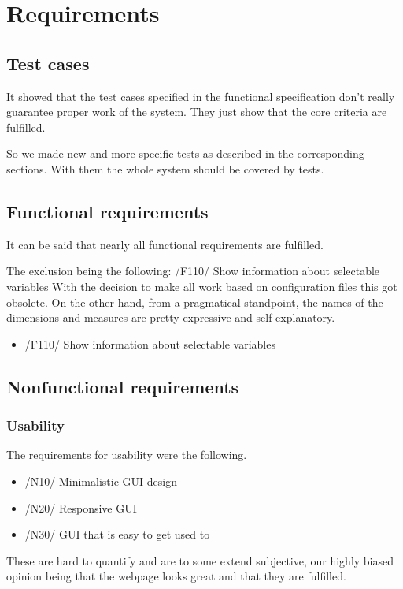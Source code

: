 \section{Requirements}\label{spec}


\subsection{Test cases}
It showed that the test cases specified in the functional specification
don't really guarantee proper work of the system. They just show
that the core criteria are fulfilled. 

So we made new and more specific tests as described in the
corresponding sections. With them the whole system should be covered by tests.

\subsection{Functional requirements}
It can be said that nearly all functional requirements are fulfilled.

The exclusion being the following: /F110/ Show information about selectable variables
With the decision to make all work based on configuration files this got obsolete.%
On the other hand, from a pragmatical standpoint, the names of the dimensions
and measures are pretty expressive and self explanatory. %
\begin{itemize}
  \item /F110/ Show information about selectable variables
\end{itemize}

\subsection{Nonfunctional requirements}
\subsubsection{Usability}
The requirements for usability were the following. 
\begin{itemize}
  \item /N10/ Minimalistic GUI design
  \item /N20/ Responsive GUI
  \item /N30/ GUI that is easy to get used to
\end{itemize}
These are hard to quantify and are to some extend subjective, 
our highly biased opinion being that the webpage looks great and that they are fulfilled.

